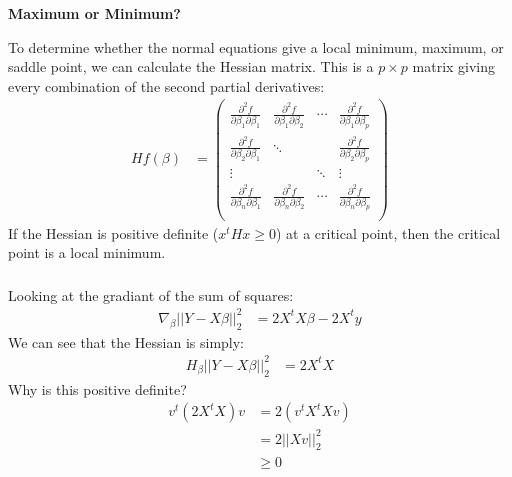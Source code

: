 \begin{frame}[fragile] \frametitle{}

{\bf Maximum or Minimum?}

To determine whether the normal equations give a local minimum, maximum, or
saddle point, we can calculate the Hessian matrix.
\pause This is a $p \times p$ matrix giving every combination of the
second partial derivatives:
\begin{align*}
H f(\beta) &=
  \left(\begin{array}{cccc}\frac{\partial^2f}{\partial \beta_1 \partial \beta_1}&\frac{\partial^2f}{\partial \beta_1 \partial \beta_2}&\cdots&\frac{\partial^2f}{\partial \beta_1 \partial \beta_p}\\
                           \frac{\partial^2f}{\partial \beta_2 \partial \beta_1}&\ddots&&\frac{\partial^2f}{\partial \beta_2 \partial \beta_p}\\
                           \vdots&&\ddots&\vdots\\
                           \frac{\partial^2f}{\partial \beta_n \partial \beta_1}&\frac{\partial^2f}{\partial \beta_n \partial \beta_2}&\cdots&\frac{\partial^2f}{\partial \beta_n \partial \beta_p}\\\end{array}\right)
\end{align*}
If the Hessian is positive definite ($x^t H x \geq 0$) at a critical point,
then the critical point is a local minimum.

\end{frame}

\begin{frame}[fragile] \frametitle{}

Looking at the gradiant of the sum of squares:
\begin{align*}
\nabla_\beta ||Y - X \beta ||_2^2 &= 2 X^t X \beta - 2 X^t y
\end{align*}
\pause We can see that the Hessian is simply:
\begin{align*}
H_\beta ||Y - X \beta ||_2^2 &= 2 X^t X
\end{align*}
\pause Why is this positive definite? \pause
\begin{align*}
v^t \left(2 X^tX \right) v &= 2 \left( v^t X^t X v\right) \\
&= 2 || X v ||_2^2 \\
&\geq 0
\end{align*}

\end{frame}


